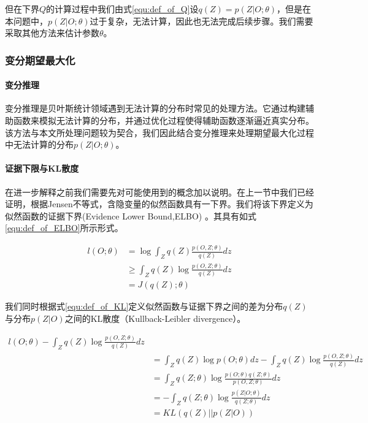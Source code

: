 但在下界$Q$的计算过程中我们由式\ref{equ:def_of_Q}设$q(Z)=p(Z|O;\theta)$，但是在本问题中，$p(Z|O;\theta)$过于复杂，无法计算，因此也无法完成后续步骤。我们需要采取其他方法来估计参数$\theta$。

\subsubsection{变分期望最大化}
\paragraph{变分推理}

变分推理是贝叶斯统计领域遇到无法计算的分布时常见的处理方法\cite{jordan_introduction_1999}。它通过构建辅助函数来模拟无法计算的分布，并通过优化过程使得辅助函数逐渐逼近真实分布。\cite{jaakkola_bayesian_2000}该方法与本文所处理问题较为契合，我们因此结合变分推理来处理期望最大化过程中无法计算的分布$p(Z|O;\theta)$。

\paragraph{证据下限与KL散度}

在进一步解释之前我们需要先对可能使用到的概念加以说明。在上一节中我们已经证明，根据Jensen不等式，含隐变量的似然函数具有一下界。我们将该下界定义为似然函数的证据下界(Evidence Lower Bound,ELBO)\cite{tzikas_variational_2008} 。其具有如式\ref{equ:def_of_ELBO}所示形式。

\begin{equation}\label{equ:def_of_ELBO}
  \begin{aligned}
l(O;\theta)
&=\log \int_Z q(Z)\frac{p(O,Z;\theta)}{q(Z)}dz\\
&\geq \int_Z q(Z) \log \frac{p(O,Z;\theta)}{q(Z)}dz\\
&=J(q(Z);\theta)
\end{aligned}\end{equation}

我们同时根据式\ref{equ:def_of_KL}定义似然函数与证据下界之间的差为分布$q(Z)$与分布$p(Z|O)$之间的KL散度（Kullback-Leibler divergence）。\cite{neal_view_1998}

\begin{equation}\label{equ:def_of_KL}
  \begin{aligned}
l(O;\theta) - \int_Z q(Z) \log \frac{p(O,Z;\theta)}{q(Z)}dz \\
&= \int_Zq(Z)\log p(O;\theta)dz- \int_Z q(Z) \log \frac{p(O,Z;\theta)}{q(Z)}dz\\
&=\int_Zq(Z;\theta)\log \frac{p(O;\theta)q(Z;\theta)}{p(O,Z;\theta)}dz\\
&=-\int_Zq(Z;\theta)\log \frac{p(Z|O;\theta)}{q(Z;\theta)}dz\\
&=KL(q(Z)||p(Z|O))
\end{aligned}\end{equation}

